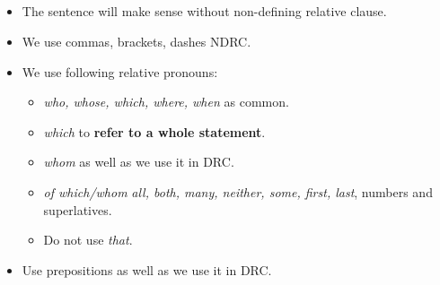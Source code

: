 \subsection{}
\begin{itemize}
    \item[\doot] The sentence will make sense without non-defining relative clause.
    \item[\doot] We use commas, brackets, dashes  NDRC.
    \item[\doot] We use following relative pronouns:
    \begin{itemize}
        \item[\daash] \textit{who, whose, which, where, when} as common.
        \item[\daash] \textit{which} to \textbf{refer to a whole statement}.
        \item[\daash] \textit{whom} as well as we use it in DRC.
        \item[\daash] \textit{of which/whom} 
        \textit{all, both, many, neither, some, first, last}, numbers and superlatives.
        \item[\daash] Do not use \textit{that}.
    \end{itemize}
    \item[\doot] Use prepositions as well as we use it in DRC.
\end{itemize}